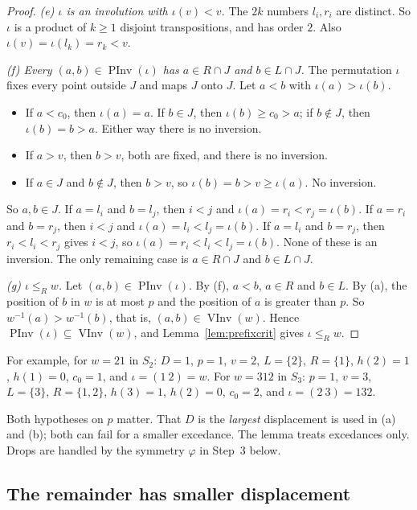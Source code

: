 \documentclass[11pt]{amsart}
\theoremstyle{definition}
\theoremstyle{remark}
\numberwithin{equation}{section}
\newcommand{\leR}{\le_R}
\DeclareMathOperator{\PInv}{PInv}
\DeclareMathOperator{\VInv}{VInv}
\begin{document}
\begin{proof}
\emph{(e) \(\iota\) is an involution with \(\iota(v)<v\).} The \(2k\) numbers \(l_i,r_i\) are distinct. So \(\iota\) is a product of \(k\ge1\) disjoint transpositions, and has order \(2\). Also \(\iota(v)=\iota(l_k)=r_k<v\).

\emph{(f) Every \((a,b)\in\PInv(\iota)\) has \(a\in R\cap J\) and \(b\in L\cap J\).} The permutation \(\iota\) fixes every point outside \(J\) and maps \(J\) onto \(J\). Let \(a<b\) with \(\iota(a)>\iota(b)\).
\begin{itemize}
\item If \(a<c_0\), then \(\iota(a)=a\). If \(b\in J\), then \(\iota(b)\ge c_0>a\); if \(b\notin J\), then \(\iota(b)=b>a\). Either way there is no inversion.
\item If \(a>v\), then \(b>v\), both are fixed, and there is no inversion.
\item If \(a\in J\) and \(b\notin J\), then \(b>v\), so \(\iota(b)=b>v\ge\iota(a)\). No inversion.
\end{itemize}
So \(a,b\in J\). If \(a=l_i\) and \(b=l_j\), then \(i<j\) and \(\iota(a)=r_i<r_j=\iota(b)\). If \(a=r_i\) and \(b=r_j\), then \(i<j\) and \(\iota(a)=l_i<l_j=\iota(b)\). If \(a=l_i\) and \(b=r_j\), then \(r_i<l_i<r_j\) gives \(i<j\), so \(\iota(a)=r_i<l_i<l_j=\iota(b)\). None of these is an inversion. The only remaining case is \(a\in R\cap J\) and \(b\in L\cap J\).

\emph{(g) \(\iota\leR w\).} Let \((a,b)\in\PInv(\iota)\). By (f), \(a<b\), \(a\in R\) and \(b\in L\). By (a), the position of \(b\) in \(w\) is at most \(p\) and the position of \(a\) is greater than \(p\). So \(w^{-1}(a)>w^{-1}(b)\), that is, \((a,b)\in\VInv(w)\). Hence \(\PInv(\iota)\subseteq\VInv(w)\), and Lemma~\ref{lem:prefixcrit} gives \(\iota\leR w\).
\end{proof}

For example, for \(w=21\) in \(S_2\): \(D=1\), \(p=1\), \(v=2\), \(L=\{2\}\), \(R=\{1\}\), \(h(2)=1\), \(h(1)=0\), \(c_0=1\), and \(\iota=(1\ 2)=w\). For \(w=312\) in \(S_3\): \(p=1\), \(v=3\), \(L=\{3\}\), \(R=\{1,2\}\), \(h(3)=1\), \(h(2)=0\), \(c_0=2\), and \(\iota=(2\ 3)=132\).

Both hypotheses on \(p\) matter. That \(D\) is the \emph{largest} displacement is used in (a) and (b); both can fail for a smaller excedance. The lemma treats excedances only. Drops are handled by the symmetry \(\varphi\) in Step~3 below.

\subsection{The remainder has smaller displacement}
\end{document}
